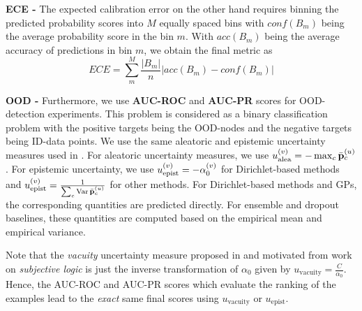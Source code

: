\textbf{ECE -}  The expected calibration error on the other hand requires binning the predicted probability scores into $M$ equally spaced bins with $conf(B_m)$ being the average probability score in the bin $m$. With $acc(B_m)$ being the average accuracy of predictions in bin $m$, we obtain the final metric as 
\begin{equation}
    ECE = \sum_m^M \frac{|B_m|}{n} |acc(B_m) - conf(B_m)|
\end{equation}

\textbf{OOD -} Furthermore, we use \textbf{AUC-ROC} and \textbf{AUC-PR} scores for OOD-detection experiments. This problem is considered as a binary classification problem with the positive targets being the OOD-nodes and the negative targets being ID-data points. We use the same aleatoric and epistemic uncertainty measures used in \citep{Charpentier2020}. For aleatoric uncertainty measures, we use $u_\text{alea}^{(v)} = - \max_c \bar{\mathbf{p}}_c^{(u)}$. For epistemic uncertainty, we use $u_\text{epist}^{(v)} = - \alpha_0^{(v)}$ for Dirichlet-based methods and $u_\text{epist}^{(v)} = \frac{1}{\sum_c \operatorname{Var} \bar{\mathbf{p}}_{c}^{(u)}}$ for other methods. For Dirichlet-based methods and GPs, the corresponding quantities are predicted directly. For ensemble and dropout baselines, these quantities are computed based on the empirical mean and empirical variance.

Note that the \emph{vacuity} uncertainty measure proposed in \citep{Zhao2020} and motivated from work on \emph{subjective logic} is just the inverse transformation of $\alpha_0$ given by $u_\text{vacuity} = \frac{C}{\alpha_0}$. Hence, the AUC-ROC and AUC-PR scores which evaluate the ranking of the examples lead to the \emph{exact} same final scores using $u_\text{vacuity}$ or $u_\text{epist}$.


